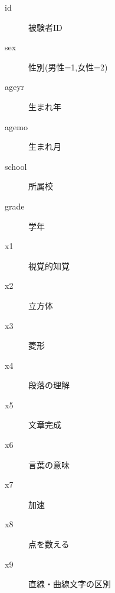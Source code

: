 \begin{description}
	\item[id] 被験者ID
	\item[sex] 性別(男性=1,女性=2)
	\item[ageyr] 生まれ年
	\item[agemo] 生まれ月
	\item[school] 所属校
	\item[grade] 学年
	\item[x1] 視覚的知覚
	\item[x2] 立方体
	\item[x3] 菱形
	\item[x4] 段落の理解
	\item[x5] 文章完成
	\item[x6] 言葉の意味
	\item[x7] 加速
	\item[x8] 点を数える
	\item[x9] 直線・曲線文字の区別
\end{description}
